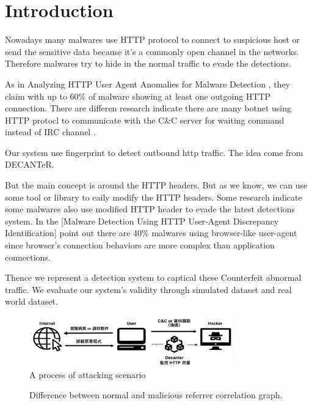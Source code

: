 \section{Introduction}

Nowadays many malwares use HTTP protocol to connect to suspicious host or send the sensitive data because it's a commonly open channel in the networks. Therefore malwares try to hide in the normal traffic to evade the detections.

As in Analyzing HTTP User Agent Anomalies for Malware Detection \cite{kheir2013analyzing}, they claim with up to 60\% of malware showing at least one outgoing HTTP connection. There are differen research indicate there are many botnet using HTTP protocl to communicate with the C\&C server for waiting command instead of IRC channel \cite{gu2008botsniffer}.

Our system use fingerprint to detect outbound http traffic. The idea come from DECANTeR.

But the main concept is around the HTTP headers. But as we know, we can use some tool or library to eaily modify the HTTP headers. Some research indicate some malwares also use modified HTTP header to evade the latest detections system. In the [Malware Detection Using HTTP User-Agent Discrepancy Identification] point out there are 40\% malwares using browser-like user-agent since browser's connection behaviors are more complex than application connections.

Thence we represent a detection system to captical these Counterfeit abnormal traffic. We evaluate our system's validity through simulated dataset and real world dataset.

\begin{figure}[!t]
\centering
\includegraphics[width=250pt]{image/attack.png}
\caption{A process of attacking scenario}
\label{fig:attack}
\end{figure}


\begin{figure}[!tbp]
  \centering
  \hfill
  \caption{Difference between normal and malicious referrer correlation graph.}
\label{fig:length_count}
\end{figure}


